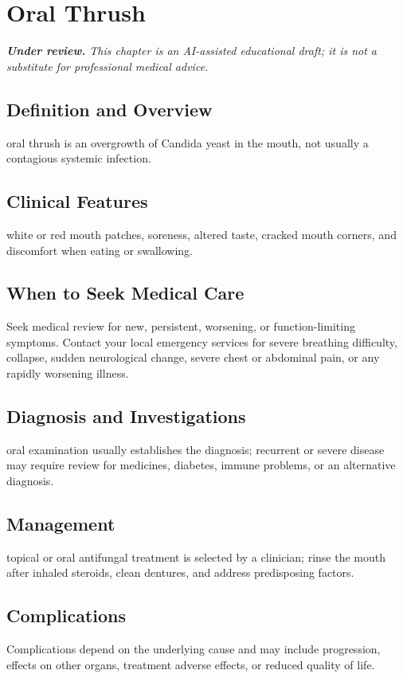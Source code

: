 \chapter{Oral Thrush}

\medskip
\noindent\textit{\textbf{Under review.} This chapter is an AI-assisted educational draft; it is not a substitute for professional medical advice.}

\section*{Definition and Overview}
oral thrush is an overgrowth of Candida yeast in the mouth, not usually a contagious systemic infection.

\section*{Clinical Features}
white or red mouth patches, soreness, altered taste, cracked mouth corners, and discomfort when eating or swallowing.

\section*{When to Seek Medical Care}
Seek medical review for new, persistent, worsening, or function-limiting symptoms. Contact your local emergency services for severe breathing difficulty, collapse, sudden neurological change, severe chest or abdominal pain, or any rapidly worsening illness.

\section*{Diagnosis and Investigations}
oral examination usually establishes the diagnosis; recurrent or severe disease may require review for medicines, diabetes, immune problems, or an alternative diagnosis.

\section*{Management}
topical or oral antifungal treatment is selected by a clinician; rinse the mouth after inhaled steroids, clean dentures, and address predisposing factors.

\section*{Complications}
Complications depend on the underlying cause and may include progression, effects on other organs, treatment adverse effects, or reduced quality of life.

